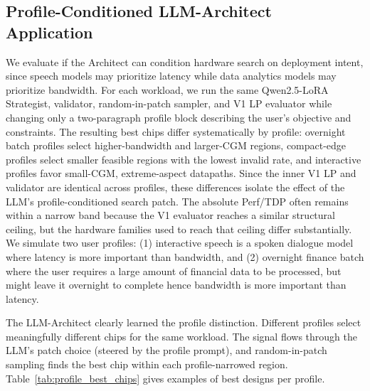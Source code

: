 \subsection{Profile-Conditioned LLM-Architect Application}
\label{app:profiles}

We evaluate if the Architect can condition hardware search on deployment intent, since speech models may prioritize latency while data analytics models may prioritize bandwidth. For each workload, we run the same Qwen2.5-LoRA Strategist, validator, random-in-patch sampler, and V1 LP evaluator while changing only a two-paragraph profile block describing the user’s objective and constraints. The resulting best chips differ systematically by profile: overnight batch profiles select higher-bandwidth and larger-CGM regions, compact-edge profiles select smaller feasible regions with the lowest invalid rate, and interactive profiles favor small-CGM, extreme-aspect datapaths. Since the inner V1 LP and validator are identical across profiles, these differences isolate the effect of the LLM’s profile-conditioned search patch. The absolute Perf/TDP often remains within a narrow band because the V1 evaluator reaches a similar structural ceiling, but the hardware families used to reach that ceiling differ substantially. We simulate two user profiles: (1) interactive speech is a spoken dialogue model where latency is more important than bandwidth, and (2) overnight finance batch where the user requires a large amount of financial data to be processed, but might leave it overnight to complete hence bandwidth is more important than latency.

The LLM-Architect clearly learned the profile distinction. Different profiles select meaningfully different chips for the same workload. The signal flows through the LLM's patch choice (steered by the profile prompt), and random-in-patch sampling finds the best chip within each profile-narrowed region. Table~\ref{tab:profile_best_chips} gives examples of best designs per profile. 

